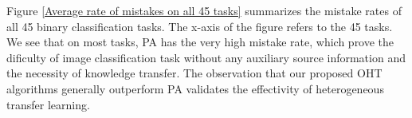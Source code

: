 \documentclass[letterpaper]{article}
\begin{document}
Figure \ref{Average rate of mistakes on all 45 tasks} summarizes the mistake rates of all 45 binary classification tasks.
The x-axis of the figure refers to the 45 tasks.
We see that on most tasks, PA has the very high mistake rate, which prove the dificulty of image classification task without any auxiliary source information and the necessity of knowledge transfer.
The observation that our proposed OHT algorithms generally outperform PA validates the effectivity of heterogeneous transfer learning.

\begin{figure}[!htb]
\begin{center}
  \\
\end{center}
\end{figure}
\end{document}

